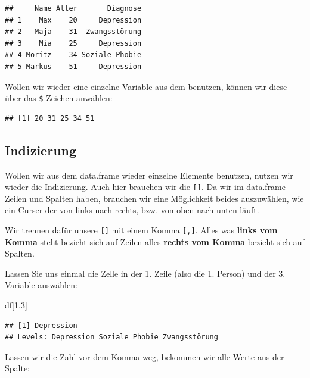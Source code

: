 \documentclass[
]{book}
\newenvironment{Shaded}{\begin{snugshade}}{\end{snugshade}}
\newcommand{\DecValTok}[1]{\textcolor[rgb]{0.00,0.00,0.81}{#1}}
\newcommand{\NormalTok}[1]{#1}
\newcommand{\SpecialCharTok}[1]{\textcolor[rgb]{0.00,0.00,0.00}{#1}}
\begin{document}
\begin{verbatim}
##     Name Alter       Diagnose
## 1    Max    20     Depression
## 2   Maja    31  Zwangsstörung
## 3    Mia    25     Depression
## 4 Moritz    34 Soziale Phobie
## 5 Markus    51     Depression
\end{verbatim}

Wollen wir wieder eine einzelne Variable aus dem benutzen, können wir diese über das \texttt{\$} Zeichen anwählen:

\begin{Shaded}
\end{Shaded}

\begin{verbatim}
## [1] 20 31 25 34 51
\end{verbatim}

\hypertarget{indizierung}{%
\subsection{Indizierung}\label{indizierung}}

Wollen wir aus dem data.frame wieder einzelne Elemente benutzen, nutzen wir wieder die Indizierung. Auch hier brauchen wir die \texttt{{[}{]}}. Da wir im data.frame Zeilen und Spalten haben, brauchen wir eine Möglichkeit beides auszuwählen, wie ein Curser der von links nach rechts, bzw. von oben nach unten läuft.

Wir trennen dafür unsere \texttt{{[}{]}} mit einem Komma \texttt{{[},{]}}. Alles was \textbf{links vom Komma} steht bezieht sich auf Zeilen alles \textbf{rechts vom Komma} bezieht sich auf Spalten.

Lassen Sie uns einmal die Zelle in der 1. Zeile (also die 1. Person) und der 3. Variable auswählen:

\begin{Shaded}
\begin{Highlighting}[]
\NormalTok{df[}\DecValTok{1}\NormalTok{,}\DecValTok{3}\NormalTok{]}
\end{Highlighting}
\end{Shaded}

\begin{verbatim}
## [1] Depression
## Levels: Depression Soziale Phobie Zwangsstörung
\end{verbatim}

Lassen wir die Zahl vor dem Komma weg, bekommen wir alle Werte aus der Spalte:
\end{document}
